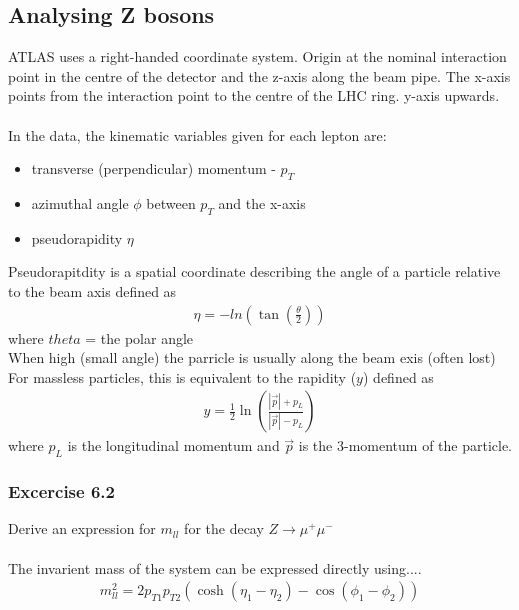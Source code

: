 \subsection{Analysing Z bosons}

ATLAS uses a right-handed coordinate system.
Origin at the nominal interaction point in the centre of the detector and the z-axis along the beam pipe.
The x-axis points from the interaction point to the centre of the LHC ring.
y-axis upwards.
\\\\
In the data, the kinematic variables given for each lepton are:
\begin{itemize}
    \item transverse (perpendicular) momentum - $p_T$
    \item azimuthal angle $\phi$ between $p_T$ and the x-axis
    \item pseudorapidity $\eta$
\end{itemize}
Pseudorapitdity is a spatial coordinate describing the angle of a particle relative to the beam axis defined as
\begin{align}
    \eta = -ln \left( \tan\left( \frac{\theta}{2} \right) \right)
\end{align}
where $theta$ = the polar angle\\
When high (small angle) the parricle is usually along the beam exis (often lost)
For massless particles, this is equivalent to the rapidity ($y$) defined as
\begin{align}
    y = \frac{1}{2}  \ln \left( \frac{|\vec{p}| + p_L}{|\vec{p}| - p_L} \right)
\end{align}
where $p_L$ is the longitudinal momentum and $\vec{p}$ is  the 3-momentum of the particle.


\subsubsection{Excercise 6.2}
Derive an expression for $m_{ll}$ for the decay $Z \rightarrow \mu^+ \mu^-$
\\\\
The invarient mass of the system can be expressed directly using....
\begin{align}
    m_{ll}^2 = 2 p_{T1} p_{T2} \left( \cosh (\eta_1 - \eta_2) - \cos(\phi_1 - \phi_2) \right)
\end{align}


